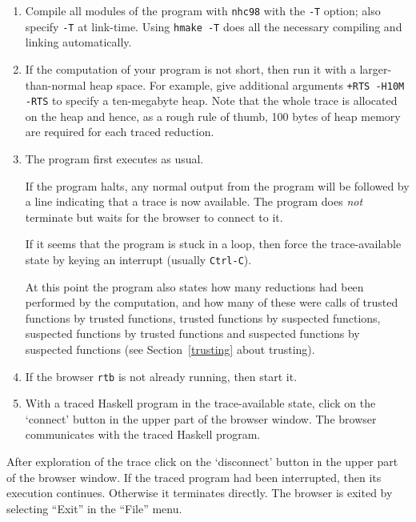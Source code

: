 \documentclass[12pt]{article}
\begin{document}
\begin{enumerate}
\item
Compile all modules of the program with \texttt{nhc98} with the \texttt{-T} option; also specify \texttt{-T} at link-time.  Using \texttt{hmake -T} does
all the necessary compiling and linking automatically.

\item
If the computation of your program is not short, then run it with a larger-than-normal heap space.
For example, give additional arguments \texttt{+RTS -H10M -RTS} to specify a ten-megabyte heap.
Note that the whole trace is allocated on the heap and hence, as a rough rule of thumb, 100 bytes of heap memory are required for each traced reduction.

\item
The program first executes as usual.

If the program halts, any normal output from the program will
be followed by a line indicating that a trace is
now available.  The program does \emph{not} terminate but waits
for the browser to connect to it.
   
If it seems that the program is stuck in a loop, then
force the trace-available state by keying an interrupt
(usually \texttt{Ctrl-C}).

At this point the program also states how many reductions had been performed by the computation, and how many of these were calls of trusted functions by trusted functions, trusted functions by suspected functions, suspected functions by trusted functions and suspected functions by suspected functions (see Section~\ref{trusting} about trusting).

\item
If the browser \texttt{rtb} is not already running, then start it.

\item
With a traced Haskell program in the trace-available
state, click on the `connect' button in the upper part
of the browser window.  
The browser communicates with the traced Haskell program.
\end{enumerate}

After exploration of the trace click on the `disconnect' button in the upper part of the browser window. If the traced program had been interrupted, then its execution continues. Otherwise it terminates directly.
The browser is exited by selecting ``Exit'' in the ``File'' menu.

\end{document}

